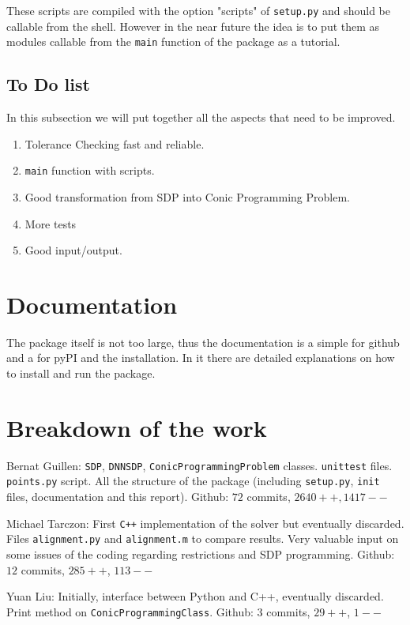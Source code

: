 \documentclass[paper=a4, fontsize=11pt]{scrartcl}
\numberwithin{equation}{section}		%
\numberwithin{figure}{section}			%
\numberwithin{table}{section}				%
\begin{document}
These scripts are compiled with the option "scripts" of \texttt{setup.py} and should be callable from the shell. However in the near future the idea is to put them as modules callable from the \texttt{main} function of the package as a tutorial. 

\subsection{To Do list}
In this subsection we will put together all the aspects that need to be improved.
\begin{enumerate}
\item Tolerance Checking fast and reliable.
\item \texttt{main} function with scripts.
\item Good transformation from SDP into Conic Programming Problem.
\item More tests
\item Good input/output.
\end{enumerate}

\section{Documentation}
The package itself is not too large, thus the documentation is a simple  for github and a  for pyPI and the installation. In it there are detailed explanations on how to install and run the package.

\section{Breakdown of the work}
Bernat Guillen: \texttt{SDP}, \texttt{DNNSDP}, \texttt{ConicProgrammingProblem} classes. \texttt{unittest} files. \texttt{points.py} script. All the structure of the package (including \texttt{setup.py}, \texttt{init} files, documentation and this report). Github: $72$ commits, $2640 ++, 1417--$

Michael Tarczon: First \texttt{C++} implementation of the solver but eventually discarded. Files \texttt{alignment.py} and \texttt{alignment.m} to compare results. Very valuable input on some issues of the coding regarding restrictions and SDP programming. Github: $12$ commits, $285++$, $113--$

Yuan Liu: Initially, interface between Python and C++, eventually discarded. Print method on \texttt{ConicProgrammingClass}. Github: $3$ commits, $29++$, $1--$
\end{document}
